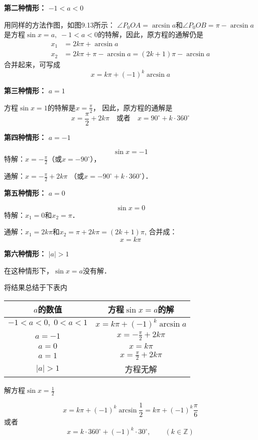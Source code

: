 \textbf{第二种情形：} $-1<a<0$

用同样的方法作图，如图9.13所示：
$\angle P_0OA=\arcsin a$和$\angle P_0OB=\pi-\arcsin a$是方程$\sin x=a,\; -1<a<0$的特解，因此，原方程的通解仍是
\[\begin{split}
  x_1&=2k\pi +\arcsin a\\
x_2&=2k\pi +\pi -\arcsin a=(2k+1)\pi -\arcsin a  
\end{split}\]
合并起来，可写成
\[x=k\pi +(-1)^k\arcsin a\]

\textbf{第三种情形：} $a=1$

方程$\sin x=1$的特解是$x=\frac{\pi}{2}$，
因此，原方程的通解是
\[x=\frac{\pi}{2}+2k\pi\quad \text{或者}\quad x=90^{\circ}+k\cdot 360^{\circ}\]

\textbf{第四种情形：} $a=-1$

\[\sin x=-1\]
特解：$x=-\frac{\pi}{2}$（或$x=-90^{\circ}$），

通解：$x=-\frac{\pi}{2}+2k\pi$ （或$x=-90^{\circ}+k\cdot 360^{\circ}$）．

\textbf{第五种情形：} $a=0$

\[\sin x=0\]
特解：$x_1=0$和$x_2=\pi$．

通解：$x_1=2k\pi$和$x_2=\pi +2k\pi =(2k+1)\pi$,
合并成：\[x=k\pi\]

\textbf{第六种情形：} $|a|>1$

在这种情形下，$\sin x=a$没有解．

将结果总结于下表内
\begin{center}
\begin{tabular}{c|c}
    \hline
$a$的数值& 方程$\sin x=a$的解\\
    \hline
$-1<a<0,\; 0<a<1$ & $x=k\pi +(-1)^k\arcsin a$\\
$a=-1$& $x=-\frac{\pi}{2}+2k\pi$\\
$a=0$&   $x=k\pi$\\
$a=1$& $x=\frac{\pi}{2}+2k\pi$\\
$|a|>1$ & 方程无解\\
    \hline
\end{tabular}   
\end{center}

\begin{example}
    解方程$\sin x=\frac{1}{2} $
\end{example}

\begin{solution}
    \[x=k\pi+(-1)^k\arcsin\frac{1}{2}=k\pi+(-1)^k\frac{\pi}{6}\]
    或者\[x=k\cdot 360^{\circ}+(-1)^k\cdot 30^{\circ},\qquad (k\in\mathbb{Z})\]
\end{solution}


